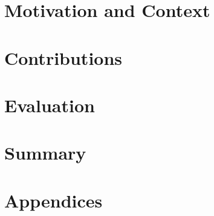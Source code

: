 \documentclass[
	titlepage=firstiscover,
	open=any,
	paper=a4,
	bibliography=totoc,
	index=totoc,
	parskip=half, %
	chapterprefix,
	twoside,
	11pt,
	headsepline,
	pagesize,
	egregdoesnotlikesansseriftitles]{scrbook}
\begin{document}
\frontmatter

\dominitoc

%

%
%







\mainmatter

\setcounter{mtc}{7}

\part{Motivation and Context}




\part{Contributions}
\label{part:contributions}






\part{Evaluation}



\part{Summary}




\printnoidxglossaries
\glsaddallunused




\part{Appendices}

\appendix



\let\clearpage\relax
\end{document}
